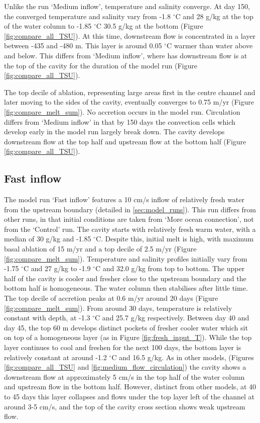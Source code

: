 Unlike the run `Medium inflow', temperature and salinity converge. At day 150, the converged temperature and salinity vary from -1.8 $^{\circ}$C and 28  g/kg at the top of the water column to -1.85 $^{\circ}$C 30.5  g/kg at the bottom (Figure \ref{fig:compare_all_TSU}). At this time, downstream flow is concentrated in a layer between -435 and -480 m. This layer is around 0.05 $^{\circ}$C warmer than water above and below. This differs from `Medium inflow', where has downstream flow is at the top of the cavity for the duration of the model run (Figure \ref{fig:compare_all_TSU}). 

The top decile of ablation, representing large areas first in the centre channel and later moving to the sides of the cavity, eventually converges to 0.75 m/yr (Figure \ref{fig:compare_melt_sum}). No accretion occurs in the model run.
Circulation differs from `Medium inflow' in that by 150 days the convection cells which develop early in the model run largely break down. The cavity develops downstream flow at the top half and upstream flow at the bottom half (Figure \ref{fig:compare_all_TSU}).

\subsection{Fast inflow} \label{sec:high_velocity}

The model run `Fast inflow' features a 10 cm/s inflow of relatively fresh water from the upstream boundary (detailed in \ref{sec:model_runs}). This run differs from other runs, in that initial conditions are taken from `More ocean connection', not from the `Control' run. The cavity starts with relatively fresh warm water, with a median of 30  g/kg and -1.85 $^{\circ}$C.  Despite this, initial melt is high, with maximum basal ablation of 15 m/yr and a top decile of 2.5 m/yr (Figure \ref{fig:compare_melt_sum}).  Temperature and salinity profiles initially vary from -1.75 $^{\circ}$C and 27  g/kg to -1.9 $^{\circ}$C and 32.0  g/kg from top to bottom. The upper half of the cavity is cooler and fresher close to the upstream boundary and the bottom half is homogeneous. The water column then stabilises after little time. The top decile of accretion peaks at 0.6 m/yr around 20 days (Figure \ref{fig:compare_melt_sum}). From around 30 days, temperature is relatively constant with depth, at -1.3 $^{\circ}$C and 25.7  g/kg respectively.  Between day 40 and day 45, the top 60 m develops distinct pockets of fresher cooler water which sit on top of a homogeneous layer (as in Figure \ref{fig:fresh_input_T}). While the top layer continues to cool and freshen for the next 100 days, the bottom layer is relatively constant at around -1.2 $^{\circ}$C and 16.5 g/kg. As in other models, (Figures \ref{fig:compare_all_TSU} and \ref{fig:medium_flow_circulation})  the cavity shows a  downstream flow at approximately 5 cm/s in the top half of the water column and upstream flow in the bottom half. However, distinct from other models, at 40 to 45 days this layer collapses and flows under the top layer left of the channel at around 3-5 cm/s, and the top of the cavity cross section shows weak upstream flow.  

